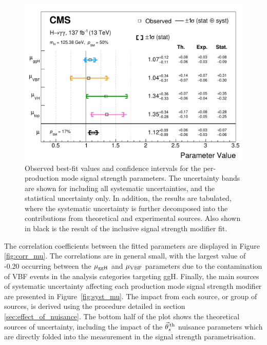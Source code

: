 \begin{figure}[htbp]
  \centering
  \includegraphics[width=1\textwidth]{Figures/hgg_results/mu_summary.pdf}
  \caption[Summary of the signal strength fit results]
  {
    Observed best-fit values and confidence intervals for the per-production mode signal strength parameters. The uncertainty bands are shown for including all systematic uncertainties, and the statistical uncertainty only. In addition, the results are tabulated, where the systematic uncertainty is further decomposed into the contributions from theoretical and experimental sources. Also shown in black is the result of the inclusive signal strength modifier fit.
  }
  \label{fig:summary_mu}
\end{figure}

The correlation coefficients between the fitted parameters are displayed in Figure \ref{fig:corr_mu}. The correlations are in general small, with the largest value of -0.20 occurring between the $\mu_{\rm{ggH}}$ and $\mu_{\rm{VBF}}$ parameters due to the contamination of VBF events in the analysis categories targeting ggH. Finally, the main sources of systematic uncertainty affecting each production mode signal strength modifier are presented in Figure~\ref{fig:syst_mu}. The impact from each source, or group of sources, is derived using the procedure detailed in section \ref{sec:effect_of_nuisance}. The bottom half of the plot shows the theoretical sources of uncertainty, including the impact of the $\vec{\theta}^{\,\rm{th}}_{s}$ nuisance parameters which are directly folded into the measurement in the signal strength parametrisation.

